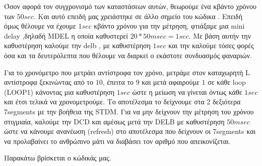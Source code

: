 \documentclass[a4paper,10pt]{article} \usepackage{anysize}
\begin{document}
Όσον αφορά τον συγχρονισμό των καταστάσεων αυτών, θεωρούμε ένα κβάντο χρόνου
των $50 sec$. Και αυτό επειδή μας χρειάστηκε σε άλλο σημείο του κώδικα . Επειδή
όμως θέλουμε να έχουμε  $1 sec$ κβάντο χρόνου για την μέτρηση, φτιάξαμε μια
mini delay ,δηλαδή MDEL η οποία καθυστερεί $20* 50msec = 1 sec$. Με βάση αυτήν
την καθυστέρηση καλούμε την delb , με  καθυστέρηση $1 sec$ και την καλούμε τόσες
φορές όσα και τα δευτερόλεπτα που θέλουμε να διαρκεί ο εκάστοτε συνδυασμός
φαναριών.

Για το χρονόμετρο που μετράει αντίστροφα τον χρόνο, μετράμε στον καταχωρητή L
αντίστροφα ξεκινώντας από το $10$, έπειτα το $9$ και μετά αφαιρούμε $1$ σε κάθε
loop (LOOP1) κάνοντας μια καθυστέρηση $1 sec$ ώστε η μείωση να γίνεται όντως
κάθε $1 sec$ και έτσι τελικά να χρονομετρούμε. Το αποτέλεσμα το δείχνουμε στα 2
δεξιότερα 7segments με την βοήθεια της STDM. Για να μην δείχνουν την μέτρηση
του χρόνου στιγμιαία, καλούμε την DCD και αμέσως μετά την DELB με καθυστέρηση
$50 msec$ ώστε να κάνουμε ανανέωση (refresh) στο αποτέλεσμα που δείχνουν οι
7segments και να προλαβαίνει το ανθρώπινο μάτι να διαβάσει τον αριθμό που
απεικονίζεται.

Παρακάτω βρίσκεται ο κώδικάς μας.

\inputminted[linenos,obeytabs,frame=leftline,fontsize=\footnotesize]{oldasm}{files/fanaria.8085}
\end{document}
